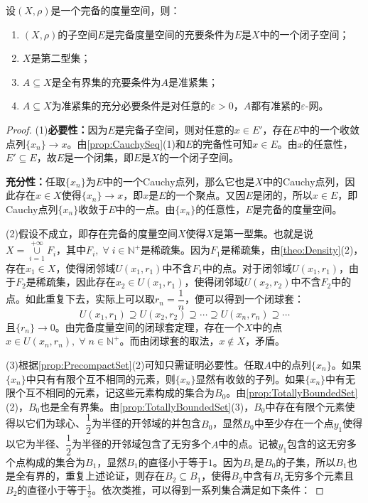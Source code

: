 \begin{property}
	设$(X,\rho)$是一个完备的度量空间，则：
	\begin{enumerate}
		\item $(X,\rho)$的子空间$E$是完备度量空间的充要条件为$E$是$X$中的一个闭子空间；
		\item $X$是第二型集；
		\item $A\subseteq X$是全有界集的充要条件为$A$是准紧集；
		\item $A\subseteq X$为准紧集的充分必要条件是对任意的$\varepsilon>0$，$A$都有准紧的$\varepsilon$-网。
	\end{enumerate}
\end{property}
\begin{proof}
	(1)\textbf{必要性：}因为$E$是完备子空间，则对任意的$x\in E'$，存在$E$中的一个收敛点列$\{x_n\}\to x$。由\cref{prop:CauchySeq}(1)和$E$的完备性可知$x\in E$。由$x$的任意性，$E'\subseteq E$，故$E$是一个闭集，即$E$是$X$的一个闭子空间。\par
	\textbf{充分性：}任取$\{x_n\}$为$E$中的一个Cauchy点列，那么它也是$X$中的Cauchy点列，因此存在$x\in X$使得$\{x_n\}\to x$，即$x$是$E$的一个聚点。又因$E$是闭的，所以$x\in E$，即Cauchy点列$\{x_n\}$收敛于$E$中的一点。由$\{x_n\}$的任意性，$E$是完备的度量空间。\par
	(2)假设不成立，即存在完备的度量空间$X$使得$X$是第一型集。也就是说$X=\underset{i=1}{\overset{+\infty}{\cup}}F_i$，其中$F_i,\;\forall\;i\in\mathbb{N}^+$是稀疏集。因为$F_1$是稀疏集，由\cref{theo:Density}(2)，存在$x_1\in X$，使得闭邻域$U(x_1,r_1)$中不含$F_1$中的点。对于闭邻域$U(x_1,r_1)$，由于$F_2$是稀疏集，因此存在$x_2\in U(x_1,r_1)$，使得闭邻域$U(x_2,r_2)$中不含$F_2$中的点。如此重复下去，实际上可以取$r_n=\dfrac{1}{n}$，便可以得到一个闭球套：
	\begin{equation*}
		U(x_1,r_1)\supseteq U(x_2,r_2)\supseteq\cdots\supseteq U(x_n,r_n)\supseteq\cdots
	\end{equation*}
	且$\{r_n\}\to0$。由完备度量空间的闭球套定理，存在一个$X$中的点$x\in U(x_n,r_n),\;\forall\;n\in\mathbb{N}^+$。而由闭球套的取法，$x\notin X$，矛盾。\par
	(3)根据\cref{prop:PrecompactSet}(2)可知只需证明必要性。任取$A$中的点列$\{x_n\}$。如果$\{x_n\}$中只有有限个互不相同的元素，则$\{x_n\}$显然有收敛的子列。如果$\{x_n\}$中有无限个互不相同的元素，记这些元素构成的集合为$B_0$。由\cref{prop:TotallyBoundedSet}(2)，$B_0$也是全有界集。由\cref{prop:TotallyBoundedSet}(3)，$B_0$中存在有限个元素使得以它们为球心、$\dfrac{1}{2}$为半径的开邻域的并包含$B_0$，显然$B_0$中至少存在一个点$y_1$使得以它为半径、$\dfrac{1}{2}$为半径的开邻域包含了无穷多个$A$中的点。记被$y_1$包含的这无穷多个点构成的集合为$B_1$，显然$B_1$的直径小于等于$1$。因为$B_1$是$B_0$的子集，所以$B_1$也是全有界的，重复上述论证，则存在$B_2\subseteq B_1$，使得$B_2$中含有$B_1$无穷多个元素且$B_2$的直径小于等于$\frac{1}{2}$。依次类推，可以得到一系列集合满足如下条件：

\end{proof}
